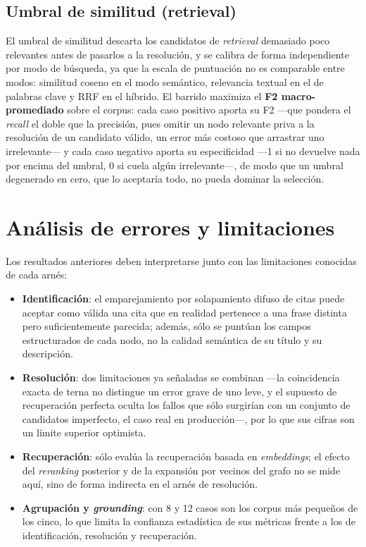 \subsection{Umbral de similitud (retrieval)}

El umbral de similitud descarta los candidatos de \textit{retrieval} demasiado poco relevantes
antes de pasarlos a la resolución, y se calibra de forma independiente por modo de búsqueda, ya
que la escala de puntuación no es comparable entre modos: similitud coseno en el modo semántico,
relevancia textual en el de palabras clave y \ac{RRF} en el híbrido. El barrido maximiza el
\textbf{F2 macro-promediado} sobre el corpus: cada caso positivo aporta su F2 —que pondera el
\textit{recall} el doble que la precisión, pues omitir un nodo relevante priva a la resolución de un
candidato válido, un error más costoso que arrastrar uno irrelevante— y cada caso negativo aporta su
especificidad —1 si no devuelve nada por encima del umbral, 0 si cuela algún irrelevante—, de modo
que un umbral degenerado en cero, que lo aceptaría todo, no pueda dominar la selección.

\section{Análisis de errores y limitaciones}
\label{sec:analisis-errores}

Los resultados anteriores deben interpretarse junto con las limitaciones conocidas de cada
arnés:

\begin{itemize}
  \item \textbf{Identificación}: el emparejamiento por solapamiento difuso de citas puede aceptar
        como válida una cita que en realidad pertenece a una frase distinta pero suficientemente
        parecida; además, sólo se puntúan los campos estructurados de cada nodo, no la calidad
        semántica de su título y su descripción.
  \item \textbf{Resolución}: dos limitaciones ya señaladas se combinan —la coincidencia exacta de
        terna no distingue un error grave de uno leve, y el supuesto de recuperación perfecta oculta
        los fallos que sólo surgirían con un conjunto de candidatos imperfecto, el caso real en
        producción—, por lo que sus cifras son un límite superior optimista.
  \item \textbf{Recuperación}: sólo evalúa la recuperación basada en \textit{embeddings}; el
        efecto del \textit{reranking} posterior y de la expansión por vecinos del grafo no se
        mide aquí, sino de forma indirecta en el arnés de resolución.
  \item \textbf{Agrupación y \textit{grounding}}: con 8 y 12 casos son los corpus más pequeños de
        los cinco, lo que limita la confianza estadística de sus métricas frente a los de
        identificación, resolución y recuperación.
\end{itemize}
